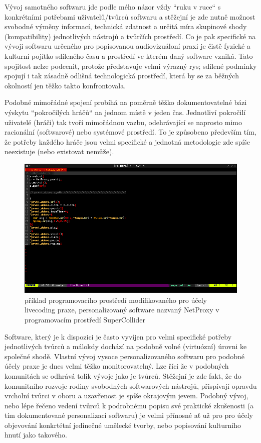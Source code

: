 \documentclass[11pt]{article} %
\begin{document}
Vývoj samotného softwaru jde podle mého názor vždy ``ruku v ruce`` s konkrétními potřebami uživatelů/tvůrců softwaru a stěžejní je zde nutně možnost svobodné výměny informací, technická zdatnost a určitá míra skupinové shody (kompatibility) jednotlivých nástrojů a tvůrčích prostředí. Co je pak specifické na vývoji softwaru určeného pro popisovanou audiovizuáloní praxi je čistě fyzické a kulturní pojítko sdíleného času a prostředí ve kterém daný software vzniká. Tato spojitost nelze podcenit, protože představuje velmi výrazný rys; sdílené podmínky spojují i tak zásadně odlišná technologická prostředí, která by se za běžných okolností jen těžko takto konfrontovala.

Podobné mimořádné spojení probíhá na poměrně těžko dokumentovatelné bázi výskytu ``pokročilých hráčů`` na jednom místě v jeden čas. Jednotliví pokročilí uživatelé (hráči) tak tvoří mimořádnou vazbu, odehrávající se naprosto mimo racionální (softwarové) nebo systémové prostředí. To je způsobeno především tím, že potřeby každého hráče jsou velmi specifické a jednotná metodologie zde spíše neexistuje (nebo existovat nemůže).

\begin{center}
\begin{figure}
\includegraphics[width=1\textwidth]{screenshot.png}
\caption{ {\small příklad programovacího prostředí modifikovaného pro účely livecoding praxe, personalizovaný software nazvaný NetProxy v programovacím prostředí SuperCollider}}
\end{figure}
\end{center}


Software, který je k dispozici je často vyvíjen pro velmi specifické potřeby jednotlivých tvůrců a málokdy dochází na podobně volné (virtuózní) úrovni ke společné shodě. Vlastní vývoj vysoce personalizovaného softwaru pro podobné účely praxe je dnes velmi těžko monitorovatelný. Lze říci že v podobných komunitách se odhrává tolik vývoje jako je tvůrců. Stěžejní je zde fakt, že do komunitního rozvoje rodiny svobodných softwarových nástrojů, přispívají opravdu vrcholní tvůrci v oboru a uzavřenost je spíše okrajovým jevem. Podobný vývoj, nebo lépe řečeno vedení tvůrců k podrobnému popisu své praktické zkušenosti (a tím dokumentované personalizaci softwaru) je velmi přínosné ať už pro pro účely objevování konkrtétní jedinečné umělecké tvorby, nebo popisování kulturního hnutí jako takového.
\end{document}
